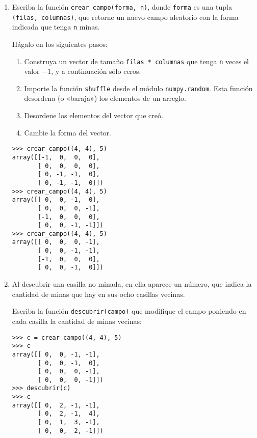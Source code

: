 \begin{enumerate}
\item
  Escriba la función \lstinline!crear_campo(forma, n)!,
  donde \lstinline!forma! es una tupla \lstinline!(filas, columnas)!, que
  retorne un nuevo campo aleatorio con la forma indicada que tenga
  \lstinline!n! minas.

  Hágalo en los siguientes pasos:

  \begin{enumerate}%
  \item
    Construya un vector de tamaño \lstinline!filas * columnas! que tenga
    \lstinline!n! veces el valor \(-1\), y a continuación sólo ceros.
  \item
    Importe la función \lstinline!shuffle! desde el módulo
    \lstinline!numpy.random!. Esta función desordena (o «baraja») los
    elementos de un arreglo.
  \item
    Desordene los elementos del vector que creó.
  \item
    Cambie la forma del vector.
  \end{enumerate}

\begin{lstlisting}
>>> crear_campo((4, 4), 5)
array([[-1,  0,  0,  0],
       [ 0,  0,  0,  0],
       [ 0, -1, -1,  0],
       [ 0, -1, -1,  0]])
>>> crear_campo((4, 4), 5)
array([[ 0,  0, -1,  0],
       [ 0,  0,  0, -1],
       [-1,  0,  0,  0],
       [ 0,  0, -1, -1]])
>>> crear_campo((4, 4), 5)
array([[ 0,  0,  0, -1],
       [ 0,  0, -1, -1],
       [-1,  0,  0,  0],
       [ 0,  0, -1,  0]])
\end{lstlisting}
\item
  Al descubrir una casilla no minada, en ella aparece un número, que
  indica la cantidad de minas que hay en sus ocho casillas vecinas.

  Escriba la función \lstinline!descubrir(campo)! que modifique el campo
  poniendo en cada casilla la cantidad de minas vecinas:

\begin{lstlisting}
>>> c = crear_campo((4, 4), 5)
>>> c
array([[ 0,  0, -1, -1],
       [ 0,  0, -1,  0],
       [ 0,  0,  0, -1],
       [ 0,  0,  0, -1]])
>>> descubrir(c)
>>> c
array([[ 0,  2, -1, -1],
       [ 0,  2, -1,  4],
       [ 0,  1,  3, -1],
       [ 0,  0,  2, -1]])
\end{lstlisting}
\end{enumerate}
